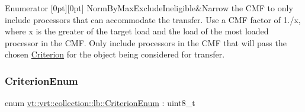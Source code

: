 \begin{DoxyEnumFields}{Enumerator}
[0pt][0pt]{}\mbox{\label{namespacevt_1_1vrt_1_1collection_1_1lb_ada1e381e6b19ba9f8277d4f698445404abaf94565ded5ad030ec19a9c5ab07d95}} 
Norm\+By\+Max\+Exclude\+Ineligible&Narrow the C\+MF to only include processors that can accommodate the transfer. Use a C\+MF factor of 1./x, where x is the greater of the target load and the load of the most loaded processor in the C\+MF. Only include processors in the C\+MF that will pass the chosen \hyperlink{structvt_1_1vrt_1_1collection_1_1lb_1_1_criterion}{Criterion} for the object being considered for transfer. \\
\hline

\end{DoxyEnumFields}
\mbox{\label{namespacevt_1_1vrt_1_1collection_1_1lb_a4e454750e102cf5404d5ac151148951c}} 
\subsubsection{\texorpdfstring{Criterion\+Enum}{CriterionEnum}}
{\footnotesize\ttfamily enum \hyperlink{namespacevt_1_1vrt_1_1collection_1_1lb_a4e454750e102cf5404d5ac151148951c}{vt\+::vrt\+::collection\+::lb\+::\+Criterion\+Enum} \+: uint8\+\_\+t\hspace{0.3cm}{\ttfamily [strong]}}


